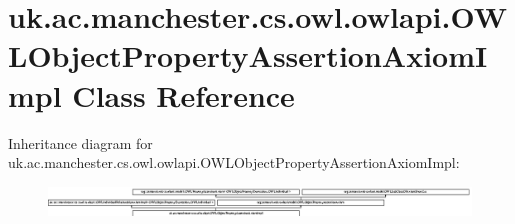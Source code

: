 \hypertarget{classuk_1_1ac_1_1manchester_1_1cs_1_1owl_1_1owlapi_1_1_o_w_l_object_property_assertion_axiom_impl}{\section{uk.\-ac.\-manchester.\-cs.\-owl.\-owlapi.\-O\-W\-L\-Object\-Property\-Assertion\-Axiom\-Impl Class Reference}
\label{classuk_1_1ac_1_1manchester_1_1cs_1_1owl_1_1owlapi_1_1_o_w_l_object_property_assertion_axiom_impl}
}
Inheritance diagram for uk.\-ac.\-manchester.\-cs.\-owl.\-owlapi.\-O\-W\-L\-Object\-Property\-Assertion\-Axiom\-Impl\-:\begin{figure}[H]
\begin{center}
\leavevmode
\includegraphics[height=0.785414cm]{classuk_1_1ac_1_1manchester_1_1cs_1_1owl_1_1owlapi_1_1_o_w_l_object_property_assertion_axiom_impl}
\end{center}
\end{figure}
